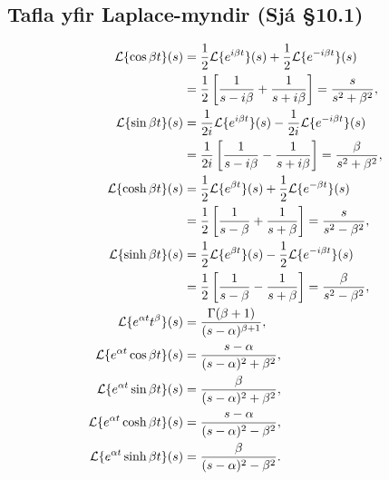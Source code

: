 \documentclass[a4paper,10pt,icelandic]{sphinxmanual}
\begin{document}
\subsection{Tafla yfir Laplace-myndir (Sjá \S{}10.1)}
\label{\detokenize{Kafli10:tafla-yfir-laplace-myndir-sja-10-1}}\begin{equation*}
\begin{split}\begin{aligned}
{\cal L}\{\cos\beta t\}(s) &=
\frac 12 {\cal L}\{e^{i\beta t}\}(s) +\frac 12{\cal L}\{e^{-i\beta t}\}(s)\\
&=\frac 12\left[\dfrac 1{s-i\beta}+\dfrac 1{s+i\beta}\right]
=\dfrac s{s^2+\beta^2},\\
{\cal L}\{\sin\beta t\}(s) &=
\frac 1{2i}{\cal L}\{e^{i\beta t}\}(s) -\frac 1{2i}{\cal L}\{e^{-i\beta t}\}(s)\\
&=\frac 1{2i}\left[\dfrac 1{s-i\beta}-\dfrac 1{s+i\beta}\right]
=\dfrac {\beta}{s^2+\beta^2},\\
{\cal L}\{\cosh \beta t\}(s) &=
\frac 12 {\cal L}\{e^{\beta t}\}(s) +\frac 12{\cal L}\{e^{-\beta t}\}(s)\\
&=\frac 12\left[\dfrac 1{s-\beta}+\dfrac 1{s+\beta}\right]
=\dfrac s{s^2-\beta^2},\\
{\cal L}\{\sinh \beta t\}(s) &=
\frac 1{2}{\cal L}\{e^{\beta t}\}(s) -\frac 1{2}{\cal L}\{e^{-i\beta t}\}(s)\\
&=\frac 1{2}\left[\dfrac 1{s-\beta}-\dfrac 1{s+\beta}\right]
=\dfrac \beta{s^2-\beta^2},\\
{\cal L}\{e^{\alpha t}t^{\beta}\}(s)
&=\dfrac{\Gamma(\beta+1)}{(s-\alpha)^{\beta+1}},\\
{\cal L}\{e^{\alpha t}\cos \beta t\}(s)
&=\dfrac{s-\alpha}{(s-\alpha)^2+\beta^2},\\
{\cal L}\{e^{\alpha t}\sin \beta t\}(s)
&=\dfrac{\beta}{(s-\alpha)^2+\beta^2},\\
{\cal L}\{e^{\alpha t}\cosh \beta t\}(s)
&=\dfrac{s-\alpha}{(s-\alpha)^2-\beta^2},\\
{\cal L}\{e^{\alpha t}\sinh \beta t\}(s)
&=\dfrac{\beta}{(s-\alpha)^2-\beta^2}.\end{aligned}\end{split}
\end{equation*}
\end{document}
